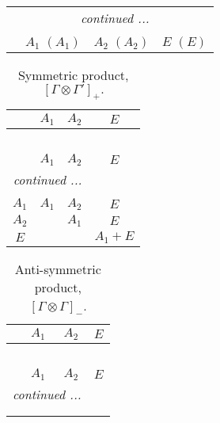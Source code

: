 \documentclass[fleqn,10pt,landscape]{article}
\begin{document}
\begin{itemize}
\begin{center}
\begin{longtable}{cccc}
 \hline \hline
\multicolumn{3}{r}{\footnotesize\it continued ...} \\ \endfoot

 \hline \hline
\multicolumn{3}{r}{} \\ \endlastfoot

 & $ A_{1}\,\,(A_{1}) $ & $ A_{2}\,\,(A_{2}) $ & $ E\,\,(E) $ \\
\end{longtable}
\end{center}
\begin{center}
\renewcommand{\arraystretch}{1.0}
\begin{longtable}{c|ccc}
\caption{Symmetric product, $[\Gamma\otimes\Gamma']_+.$}
 \\
 \hline \hline
 & $ A_{1} $ & $ A_{2} $ & $ E $ \\ \hline \endfirsthead

\multicolumn{3}{l}{\tablename\ \thetable{}} \\
 \hline \hline
 & $ A_{1} $ & $ A_{2} $ & $ E $ \\ \hline \endhead

 \hline \hline
\multicolumn{3}{r}{\footnotesize\it continued ...} \\ \endfoot

 \hline \hline
\multicolumn{3}{r}{} \\ \endlastfoot

$ A_{1} $ & $ A_{1} $ & $ A_{2} $ & $ E $ \\
$ A_{2} $ & $  $ & $ A_{1} $ & $ E $ \\
$ E $ & $  $ & $  $ & $ A_{1} + E $ \\
\end{longtable}
\end{center}
\begin{center}
\renewcommand{\arraystretch}{1.0}
\begin{longtable}{cccc}
\caption{Anti-symmetric product, $[\Gamma\otimes\Gamma]_-$.}
 \\
 \hline \hline
 & $ A_{1} $ & $ A_{2} $ & $ E $ \\ \hline \endfirsthead

\multicolumn{3}{l}{\tablename\ \thetable{}} \\
 \hline \hline
 & $ A_{1} $ & $ A_{2} $ & $ E $ \\ \hline \endhead

 \hline \hline
\multicolumn{3}{r}{\footnotesize\it continued ...} \\ \endfoot

 \hline \hline
\multicolumn{3}{r}{} \\ \endlastfoot


\end{longtable}
\end{center}
\end{itemize}
\end{document}
